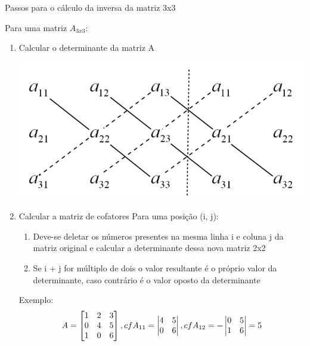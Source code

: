 \documentclass[10pt]{beamer}
\begin{document}
\begin{frame}[fragile]{Passos para o cálculo da inversa da matriz 3x3}
  
  Para uma matriz $A_{3x3}$:
  \begin{enumerate}
  \item Calcular o determinante da matriz A
  \begin{center}
    \includegraphics[scale=0.15]{images/determinante.png}
  \end{center}
  \item Calcular a matriz de cofatores \newline
  Para uma posição (i, j):
    \begin{enumerate}
      \item Deve-se deletar os números presentes na mesma linha i e coluna j da matriz original e calcular a determinante dessa nova matriz 2x2
      \item Se i + j for múltiplo de dois o valor resultante é o próprio valor da determinante, caso contrário é o valor oposto da determinante
    \end{enumerate}
  Exemplo: 
    \[
    A = \begin{bmatrix}
      1 & 2 & 3 \\
      0 & 4 & 5 \\
      1 & 0 & 6
    \end{bmatrix}, 
    cfA_{11} = \begin{vmatrix}
      4 & 5 \\ 
      0 & 6 \notag
    \end{vmatrix}, 
    cfA_{12} = -\begin{vmatrix}
      0 & 5 \\ 
      1 & 6 \notag
    \end{vmatrix}
    =
    5    
    \]
  \end{enumerate}

\end{frame}
\end{document}
